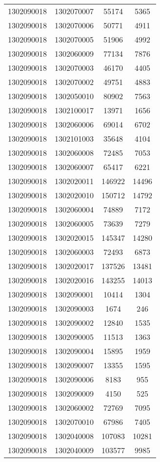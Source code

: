 \begin{longtable}[h]{llcc}
		1302090018 & 1302070007 & 55174 & 5365\\
		1302090018 & 1302070006 & 50771 & 4911\\
		1302090018 & 1302070005 & 51906 & 4992\\
		1302090018 & 1302060009 & 77134 & 7876\\
		1302090018 & 1302070003 & 46170 & 4405\\
		1302090018 & 1302070002 & 49751 & 4883\\
		1302090018 & 1302050010 & 80902 & 7563\\
		1302090018 & 1302100017 & 13971 & 1656\\
		1302090018 & 1302060006 & 69014 & 6702\\
		1302090018 & 1302101003 & 35648 & 4104\\
		1302090018 & 1302060008 & 72485 & 7053\\
		1302090018 & 1302060007 & 65417 & 6221\\
		1302090018 & 1302020011 & 146922 & 14496\\
		1302090018 & 1302020010 & 150712 & 14792\\
		1302090018 & 1302060004 & 74889 & 7172\\
		1302090018 & 1302060005 & 73639 & 7279\\
		1302090018 & 1302020015 & 145347 & 14280\\
		1302090018 & 1302060003 & 72493 & 6873\\
		1302090018 & 1302020017 & 137526 & 13481\\
		1302090018 & 1302020016 & 143255 & 14013\\
		1302090018 & 1302090001 & 10414 & 1304\\
		1302090018 & 1302090003 & 1674 & 246\\
		1302090018 & 1302090002 & 12840 & 1535\\
		1302090018 & 1302090005 & 11513 & 1363\\
		1302090018 & 1302090004 & 15895 & 1959\\
		1302090018 & 1302090007 & 13355 & 1595\\
		1302090018 & 1302090006 & 8183 & 955\\
		1302090018 & 1302090009 & 4150 & 525\\
		1302090018 & 1302060002 & 72769 & 7095\\
		1302090018 & 1302070010 & 67986 & 7405\\
		1302090018 & 1302040008 & 107083 & 10281\\
		1302090018 & 1302040009 & 103577 & 9985\\

\end{longtable}
